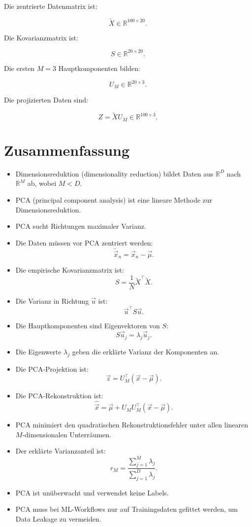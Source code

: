 \begin{examplebox}
Die zentrierte Datenmatrix ist:

\[
    \tilde{X}\in\mathbb{R}^{100\times 20}.
\]

Die Kovarianzmatrix ist:

\[
    S\in\mathbb{R}^{20\times 20}.
\]

Die ersten \(M=3\) Hauptkomponenten bilden:

\[
    U_M\in\mathbb{R}^{20\times 3}.
\]

Die projizierten Daten sind:

\[
    Z=\tilde{X}U_M
    \in
    \mathbb{R}^{100\times 3}.
\]
\end{examplebox}

\section{Zusammenfassung}

\begin{itemize}
    \item Dimensionsreduktion (dimensionality reduction) bildet Daten aus \(\mathbb{R}^D\) nach \(\mathbb{R}^M\) ab, wobei \(M<D\).
    \item PCA (principal component analysis) ist eine lineare Methode zur Dimensionsreduktion.
    \item PCA sucht Richtungen maximaler Varianz.
    \item Die Daten müssen vor PCA zentriert werden:
    \[
        \tilde{\vec{x}}_n
        =
        \vec{x}_n-\vec{\mu}.
    \]
    \item Die empirische Kovarianzmatrix ist:
    \[
        S
        =
        \frac{1}{N}
        \tilde{X}^{\top}\tilde{X}.
    \]
    \item Die Varianz in Richtung \(\vec{u}\) ist:
    \[
        \vec{u}^{\top}S\vec{u}.
    \]
    \item Die Hauptkomponenten sind Eigenvektoren von \(S\):
    \[
        S\vec{u}_j
        =
        \lambda_j\vec{u}_j.
    \]
    \item Die Eigenwerte \(\lambda_j\) geben die erklärte Varianz der Komponenten an.
    \item Die PCA-Projektion ist:
    \[
        \vec{z}
        =
        U_M^{\top}(\vec{x}-\vec{\mu}).
    \]
    \item Die PCA-Rekonstruktion ist:
    \[
        \hat{\vec{x}}
        =
        \vec{\mu}
        +
        U_MU_M^{\top}
        (\vec{x}-\vec{\mu}).
    \]
    \item PCA minimiert den quadratischen Rekonstruktionsfehler unter allen linearen \(M\)-dimensionalen Unterräumen.
    \item Der erklärte Varianzanteil ist:
    \[
        r_M
        =
        \frac{\sum_{j=1}^{M}\lambda_j}
        {\sum_{j=1}^{D}\lambda_j}.
    \]
    \item PCA ist unüberwacht und verwendet keine Labels.
    \item PCA muss bei ML-Workflows nur auf Trainingsdaten gefittet werden, um Data Leakage zu vermeiden.
\end{itemize}

